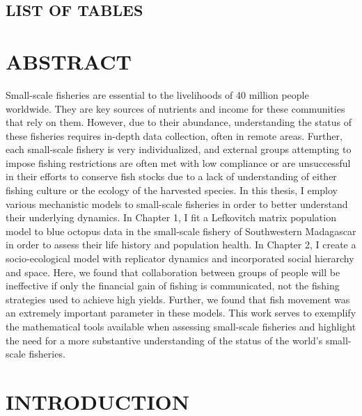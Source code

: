 \documentclass[
]{article}
\begin{document}
\vspace{-1.5cm}
\listoffigures

\newpage

\hypertarget{list-of-tables}{%
\subsection{LIST OF TABLES}\label{list-of-tables}}

\vspace{-1.5cm}
\listoftables

\newpage

\hypertarget{abstract}{%
\section{ABSTRACT}\label{abstract}}

Small-scale fisheries are essential to the livelihoods of 40 million people worldwide. They are key sources of nutrients and income for these communities that rely on them. However, due to their abundance, understanding the status of these fisheries requires in-depth data collection, often in remote areas. Further, each small-scale fishery is very individualized, and external groups attempting to impose fishing restrictions are often met with low compliance or are unsuccessful in their efforts to conserve fish stocks due to a lack of understanding of either fishing culture or the ecology of the harvested species. In this thesis, I employ various mechanistic models to small-scale fisheries in order to better understand their underlying dynamics. In Chapter 1, I fit a Lefkovitch matrix population model to blue octopus data in the small-scale fishery of Southwestern Madagascar in order to assess their life history and population health. In Chapter 2, I create a socio-ecological model with replicator dynamics and incorporated social hierarchy and space. Here, we found that collaboration between groups of people will be ineffective if only the financial gain of fishing is communicated, not the fishing strategies used to achieve high yields. Further, we found that fish movement was an extremely important parameter in these models. This work serves to exemplify the mathematical tools available when assessing small-scale fisheries and highlight the need for a more substantive understanding of the status of the world's small-scale fisheries.

\newpage


\hypertarget{introduction}{%
\section{INTRODUCTION}\label{introduction}}
\end{document}
